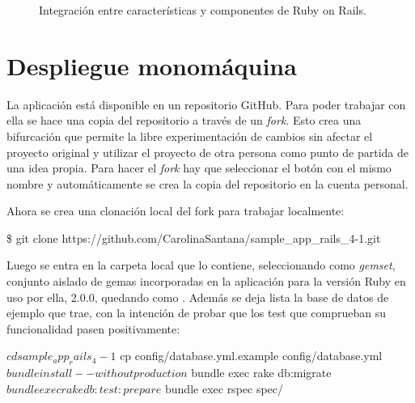 \begin{figure}[H]
\caption{Integración entre características y componentes de Ruby on Rails.\label{fig:figure_placement_example}}
\end{figure}

\section{Despliegue monomáquina}

La aplicación  está disponible en un repositorio GitHub. Para poder trabajar con ella se hace una copia del repositorio a través de un \textit{fork}. Esto crea una bifurcación que permite la libre experimentación de cambios sin afectar el proyecto original y utilizar el proyecto de otra persona como punto de partida de una idea propia. Para hacer el \textit{fork} hay que seleccionar el botón con el mismo nombre y automáticamente se crea la copia del repositorio en la cuenta personal.

Ahora se crea una clonación local del fork para trabajar localmente:

\begin{codelisting}
\label{code:forkclone}
\begin{code}
\$ git clone https://github.com/CarolinaSantana/sample_app_rails_4-1.git
\end{code}
\end{codelisting}

Luego se entra en la carpeta local que lo contiene, seleccionando como \textit{gemset}, conjunto aislado de gemas incorporadas en la aplicación para la versión Ruby en uso por ella, 2.0.0, quedando como . Además se deja lista la base de datos de ejemplo que trae, con la intención de probar que los test que comprueban su funcionalidad pasen positivamente: 

\begin{codelisting}
\label{code:forkclone}
\begin{code}
$ cd sample_app_rails_4-1
$ cp config/database.yml.example config/database.yml
$ bundle install --without production
$ bundle exec rake db:migrate
$ bundle exec rake db:test:prepare
$ bundle exec rspec spec/
\end{code}
\end{codelisting}

